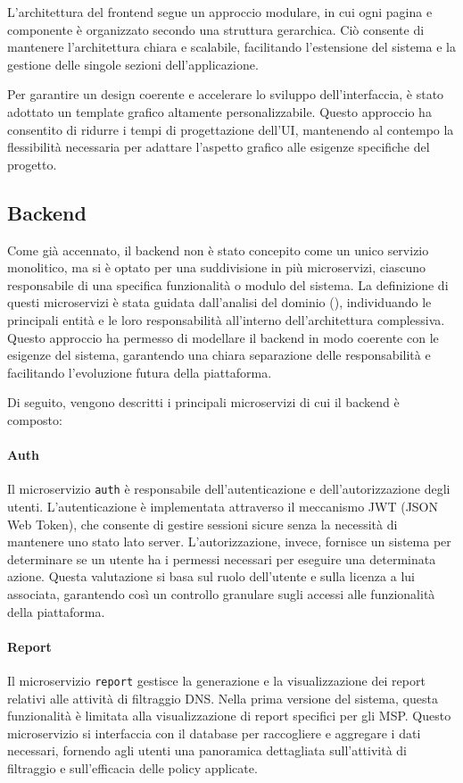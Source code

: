 L'architettura del frontend segue un approccio modulare, in cui ogni pagina e componente è organizzato secondo una struttura gerarchica. Ciò consente di mantenere l'architettura chiara e scalabile, facilitando l'estensione del sistema e la gestione delle singole sezioni dell'applicazione.

Per garantire un design coerente e accelerare lo sviluppo dell'interfaccia, è stato adottato un template grafico altamente personalizzabile. Questo approccio ha consentito di ridurre i tempi di progettazione dell’UI, mantenendo al contempo la flessibilità necessaria per adattare l’aspetto grafico alle esigenze specifiche del progetto.

\subsection{Backend}
Come già accennato, il backend non è stato concepito come un unico servizio monolitico, ma si è optato per una suddivisione in più microservizi, ciascuno responsabile di una specifica funzionalità o modulo del sistema. La definizione di questi microservizi è stata guidata dall'analisi del dominio (), individuando le principali entità e le loro responsabilità all'interno dell'architettura complessiva. Questo approccio ha permesso di modellare il backend in modo coerente con le esigenze del sistema, garantendo una chiara separazione delle responsabilità e facilitando l'evoluzione futura della piattaforma.

Di seguito, vengono descritti i principali microservizi di cui il backend è composto:
\paragraph{Auth}
Il microservizio \texttt{auth} è responsabile dell'autenticazione e dell'autorizzazione degli utenti. L'autenticazione è implementata attraverso il meccanismo JWT (JSON Web Token), che consente di gestire sessioni sicure senza la necessità di mantenere uno stato lato server.
L'autorizzazione, invece, fornisce un sistema per determinare se un utente ha i permessi necessari per eseguire una determinata azione. Questa valutazione si basa sul ruolo dell'utente e sulla licenza a lui associata, garantendo così un controllo granulare sugli accessi alle funzionalità della piattaforma.

\paragraph{Report}
Il microservizio \texttt{report} gestisce la generazione e la visualizzazione dei report relativi alle attività di filtraggio DNS. Nella prima versione del sistema, questa funzionalità è limitata alla visualizzazione di report specifici per gli MSP. Questo microservizio si interfaccia con il database per raccogliere e aggregare i dati necessari, fornendo agli utenti una panoramica dettagliata sull'attività di filtraggio e sull'efficacia delle policy applicate.

